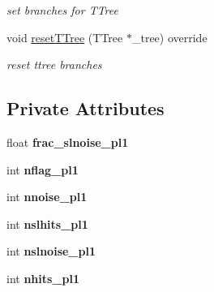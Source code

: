 \begin{DoxyCompactItemize}
\begin{DoxyCompactList}\small\item\em set branches for T\+Tree \end{DoxyCompactList}\item 
void \hyperlink{classanalysis_1_1PMTNoise_a62da6c7527b9e7364d381b860937f3af}{reset\+T\+Tree} (T\+Tree $\ast$\+\_\+tree) override\hypertarget{classanalysis_1_1PMTNoise_a62da6c7527b9e7364d381b860937f3af}{}\label{classanalysis_1_1PMTNoise_a62da6c7527b9e7364d381b860937f3af}

\begin{DoxyCompactList}\small\item\em reset ttree branches \end{DoxyCompactList}\end{DoxyCompactItemize}
\subsection*{Private Attributes}
\begin{DoxyCompactItemize}
\item 
float {\bfseries frac\+\_\+slnoise\+\_\+pl1}\hypertarget{classanalysis_1_1PMTNoise_abfcea00205eb7f7920ff05aad6e4a38e}{}\label{classanalysis_1_1PMTNoise_abfcea00205eb7f7920ff05aad6e4a38e}

\item 
int {\bfseries nflag\+\_\+pl1}\hypertarget{classanalysis_1_1PMTNoise_a9bdfa7a3c4ce11254d360cd986b15d9d}{}\label{classanalysis_1_1PMTNoise_a9bdfa7a3c4ce11254d360cd986b15d9d}

\item 
int {\bfseries nnoise\+\_\+pl1}\hypertarget{classanalysis_1_1PMTNoise_afb7060750a3706698327c674dc74dc25}{}\label{classanalysis_1_1PMTNoise_afb7060750a3706698327c674dc74dc25}

\item 
int {\bfseries nslhits\+\_\+pl1}\hypertarget{classanalysis_1_1PMTNoise_ad0f9abc978569f8c1b5cb1df6b55f5f7}{}\label{classanalysis_1_1PMTNoise_ad0f9abc978569f8c1b5cb1df6b55f5f7}

\item 
int {\bfseries nslnoise\+\_\+pl1}\hypertarget{classanalysis_1_1PMTNoise_a7392a852a973022c0cd04e3acf49ead7}{}\label{classanalysis_1_1PMTNoise_a7392a852a973022c0cd04e3acf49ead7}

\item 
int {\bfseries nhits\+\_\+pl1}\hypertarget{classanalysis_1_1PMTNoise_a55a48b14096d97c8232f698902c92a3f}{}\label{classanalysis_1_1PMTNoise_a55a48b14096d97c8232f698902c92a3f}

\end{DoxyCompactItemize}


